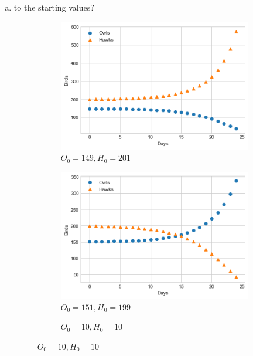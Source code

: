\documentclass[10pt]{report}
\begin{document}
\begin{enumerate}
\begin{enumerate}[a.]
		\item 
		to the starting values?
		\begin{figure}[H]
			\centering
			\begin{subfigure}[b]{.3\linewidth}
				\caption{$O_0 = 149, H_0 = 201$}
				\includegraphics[width=\linewidth]{s1_4/oh-1.png}
			\end{subfigure}
			\begin{subfigure}[b]{.3\linewidth}
				\caption{$O_0 = 151, H_0 = 199$}
				\includegraphics[width=\linewidth]{s1_4/oh-2.png}
			\end{subfigure}
			\begin{subfigure}[b]{.3\linewidth}
				\caption{$O_0 = 10, H_0 = 10$}

\end{subfigure}
\end{figure}
\end{enumerate}
\end{enumerate}
\end{document}
